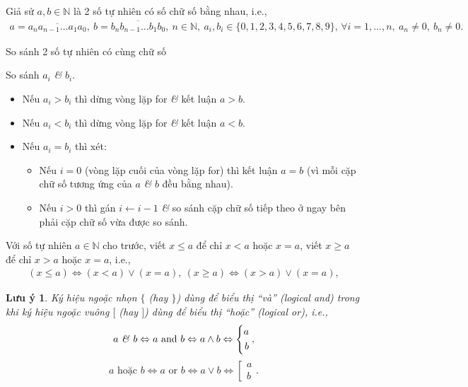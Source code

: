\documentclass{article}
\numberwithin{equation}{section}
\newtheorem{remark}{Lưu ý}[section]
\begin{document}
Giả sử $a,b\in\mathbb{N}$ là 2 số tự nhiên có số chữ số bằng nhau, i.e.,
\begin{align*}
	a = \overline{a_na_{n-1}\ldots a_1a_0},\ b = \overline{b_nb_{n-1}\ldots b_1b_0},\ n\in\mathbb{N},\ a_i,b_i\in\{0,1,2,3,4,5,6,7,8,9\},\,\forall i = 1,\ldots,n,\ a_n\ne 0,\ b_n\ne 0.
\end{align*}

\begin{algorithm}
	\caption{So sánh 2 số tự nhiên có cùng chữ số}\label{alg:compare naturals with same digits}
	\begin{algorithmic}[1]
		 So sánh $a_i$ \textit{\&} $b_i$.
		\begin{itemize}
			\item Nếu $a_i > b_i$ thì dừng vòng lặp for \textit{\&} kết luận $a > b$.
			\item Nếu $a_i < b_i$ thì dừng vòng lặp for \textit{\&} kết luận $a < b$.
			\item Nếu $a_i = b_i$ thì xét:
			\begin{itemize}
				\item Nếu $i = 0$ (vòng lặp cuối của vòng lặp for) thì kết luận $a = b$ (vì mỗi cặp chữ số tương ứng của $a$ \textit{\&} $b$ đều bằng nhau).
				\item Nếu $i > 0$ thì gán $i\leftarrow i - 1$ \textit{\&} so sánh cặp chữ số tiếp theo ở ngay bên phải cặp chữ số vừa được so sánh.
			\end{itemize}			 
		\end{itemize}		
		\EndFor
	\end{algorithmic}
\end{algorithm}
Với số tự nhiên $a\in\mathbb{N}$ cho trước, viết $x\le a$ để chỉ $x < a$ hoặc $x = a$, viết $x\ge a$ để chỉ $x > a$ hoặc $x = a$, i.e.,
\begin{align*}
	(x\le a)\Leftrightarrow(x < a)\lor(x = a),\ (x\ge a)\Leftrightarrow(x > a)\lor(x = a),
\end{align*}

\begin{remark}
	Ký hiệu ngoặc nhọn $\{$ (hay $\}$) dùng để biểu thị ``và'' (logical and) trong khi ký hiệu ngoặc vuông $[$ (hay $]$) dùng để biểu thị ``hoặc'' (logical or), i.e.,
	\begin{equation*}
		a\mbox{ \textit{\&} } b\Leftrightarrow a\mbox{ and } b\Leftrightarrow a\land b\Leftrightarrow\left\{\begin{split}
			a\\b
		\end{split}\right.,	
	\end{equation*}
	\begin{equation*}
		a\mbox{ hoặc } b\Leftrightarrow a\mbox{ or } b\Leftrightarrow a\lor b\Leftrightarrow\left[\begin{split}
			a\\b
		\end{split}\right..
	\end{equation*}
\end{remark}
\end{document}
